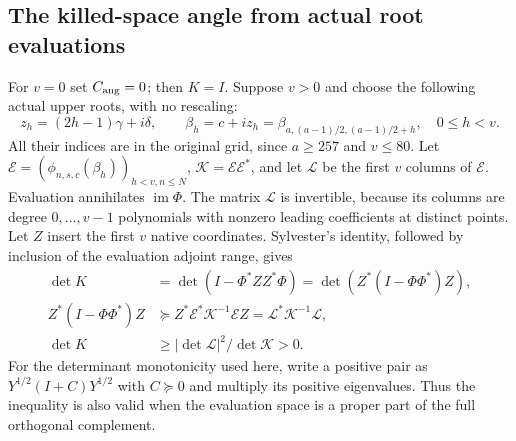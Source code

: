 \documentclass[11pt,a4paper]{article}
\begin{document}
\subsection{The killed-space angle from actual root evaluations}
For $v=0$ set $C_{\rm ang}=0$; then $K=I$. Suppose $v>0$ and choose
the following actual upper roots, with no rescaling:
\[
z_h=(2h-1)\gamma+i\delta,\qquad
\beta_h=c+iz_h=\beta_{a,(a-1)/2,(a-1)/2+h},\quad0\le h<v.
\tag{CRP10}
\]
All their indices are in the original grid, since $a\ge257$ and
$v\le80$. Let $\mathcal E=(\phi_{n,s,c}(\beta_h))_{h<v,n\le N}$,
$\mathcal K=\mathcal E\mathcal E^*$, and let $\mathcal L$ be the first
$v$ columns of $\mathcal E$. Evaluation annihilates $\operatorname{im}\Phi$.
The matrix $\mathcal L$ is invertible, because its columns are degree
$0,\ldots,v-1$ polynomials with nonzero leading coefficients at distinct
points. Let $Z$ insert the first $v$ native coordinates. Sylvester's
identity, followed by inclusion of the evaluation adjoint range, gives
\[
\begin{split}
\det K&=\det(I-\Phi^*ZZ^*\Phi)
 =\det(Z^*(I-\Phi\Phi^*)Z),\\
Z^*(I-\Phi\Phi^*)Z&\succeq
 Z^*\mathcal E^*\mathcal K^{-1}\mathcal E Z
 =\mathcal L^*\mathcal K^{-1}\mathcal L,\\
\det K&\ge |\det\mathcal L|^2/\det\mathcal K>0.
\end{split}\tag{CRP11}
\]
For the determinant monotonicity used here, write a positive pair as
$Y^{1/2}(I+C)Y^{1/2}$ with $C\succeq0$ and multiply its positive
eigenvalues. Thus the inequality is also valid when the evaluation
space is a proper part of the full orthogonal complement.
\end{document}
